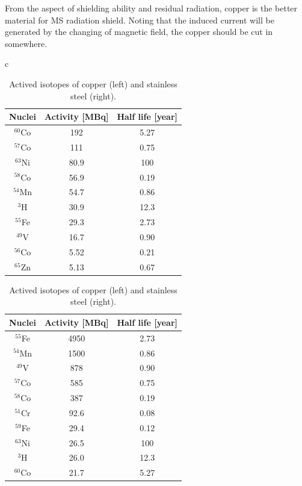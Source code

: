 From the aspect of shielding ability and residual radiation, copper is the better material for MS radiation shield.
Noting that the induced current will be generated by the changing of magnetic field, the copper should be cut in somewhere.
\begin{table}[H]
 \centering
 \begin{tabular}{c}
  \begin{minipage}{0.4\textwidth}
  \centering
  \begin{tabular}{ccc} \hline \hline
   Nuclei & Activity [MBq] & Half life [year] \\ \hline
   $^{60}$Co & 192 & 5.27 \\
   $^{57}$Co & 111 & 0.75 \\
   $^{63}$Ni & 80.9 & 100 \\
   $^{58}$Co & 56.9 & 0.19 \\
   $^{54}$Mn & 54.7 & 0.86 \\
   $^3$H & 30.9 & 12.3 \\
   $^{55}$Fe & 29.3 & 2.73 \\
   $^{49}$V & 16.7 & 0.90 \\
   $^{56}$Co & 5.52 & 0.21 \\
   $^{65}$Zn & 5.13 & 0.67 \\ \hline \hline
  \end{tabular}
  \end{minipage}
  \hspace{0.1\textwidth}
  \begin{minipage}{0.4\textwidth}
  \centering
  \begin{tabular}{ccc} \hline \hline
   Nuclei & Activity [MBq] & Half life [year] \\ \hline
   $^{55}$Fe & 4950 & 2.73 \\
   $^{54}$Mn & 1500 & 0.86 \\
   $^{49}$V & 878 & 0.90 \\
   $^{57}$Co & 585 & 0.75 \\
   $^{58}$Co & 387 & 0.19 \\
   $^{51}$Cr & 92.6 & 0.08 \\
   $^{59}$Fe & 29.4 & 0.12 \\
   $^{63}$Ni & 26.5 & 100 \\
   $^3$H & 26.0 & 12.3 \\
   $^{60}$Co & 21.7 & 5.27 \\ \hline \hline
  \end{tabular}
  \end{minipage}
 \end{tabular}
 \caption{Actived isotopes of copper (left) and stainless steel (right).}
 \label{2atom}
\end{table}

